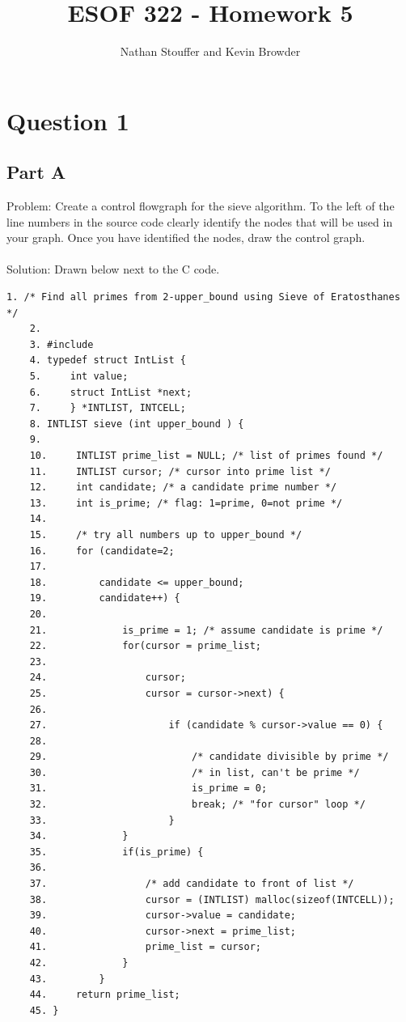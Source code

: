 \documentclass{article}
\begin{document}
	
\title{ESOF 322 - Homework 5}
\author{Nathan Stouffer and Kevin Browder}

\maketitle
\newpage

\section*{Question 1}
\subsection*{Part A}
Problem: Create a control flowgraph for the sieve algorithm. To the left of the line numbers in the
source code clearly identify the nodes that will be used in your graph. Once you have
identified the nodes, draw the control graph. \\\\
Solution: Drawn below next to the C code.
\begin{Verbatim}[tabsize=4]
	1. /* Find all primes from 2-upper_bound using Sieve of Eratosthanes */
	2.
	3. #include
	4. typedef struct IntList {
	5.     int value;
	6.     struct IntList *next;
	7.     } *INTLIST, INTCELL;
	8. INTLIST sieve (int upper_bound ) {
	9.
	10.     INTLIST prime_list = NULL; /* list of primes found */
	11.     INTLIST cursor; /* cursor into prime list */
	12.     int candidate; /* a candidate prime number */
	13.     int is_prime; /* flag: 1=prime, 0=not prime */
	14.
	15.     /* try all numbers up to upper_bound */
	16.     for (candidate=2;
	17.
	18.         candidate <= upper_bound;
	19.         candidate++) {
	20.
	21.             is_prime = 1; /* assume candidate is prime */
	22.             for(cursor = prime_list;
	23.
	24.                 cursor;
	25.                 cursor = cursor->next) {
	26.
	27.                     if (candidate % cursor->value == 0) {
	28.
	29.                         /* candidate divisible by prime */
	30.                         /* in list, can't be prime */
	31.                         is_prime = 0;
	32.                         break; /* "for cursor" loop */
	33.                     }
	34.             }
	35.             if(is_prime) {
	36.
	37.                 /* add candidate to front of list */
	38.                 cursor = (INTLIST) malloc(sizeof(INTCELL));
	39.                 cursor->value = candidate;
	40.                 cursor->next = prime_list;
	41.                 prime_list = cursor;
	42.             }
	43.         }
	44.     return prime_list;
	45. }
\end{Verbatim}
\end{document}
